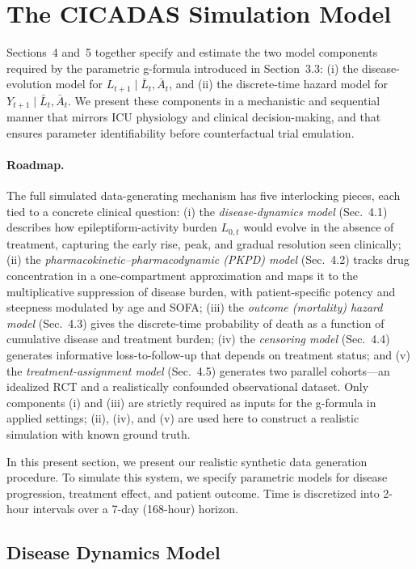 \section{The CICADAS Simulation Model}
\label{sec:datagen}
Sections~4 and~5 together specify and estimate the two model components required by the parametric g-formula introduced in Section~3.3: (i) the disease-evolution model for
$L_{t+1} \mid \bar{L}_t, \bar{A}_t$, and (ii) the discrete-time hazard model for
$Y_{t+1} \mid \bar{L}_t, \bar{A}_t$.
We present these components in a mechanistic and sequential manner that mirrors ICU physiology and clinical decision-making, and that ensures parameter identifiability before counterfactual trial emulation.

\paragraph{Roadmap.} The full simulated data-generating mechanism has five interlocking
pieces, each tied to a concrete clinical question:
(i) the \emph{disease-dynamics model} (Sec.~4.1) describes how
epileptiform-activity burden $L_{0,t}$ would evolve in the absence of treatment, capturing
the early rise, peak, and gradual resolution seen clinically;
(ii) the \emph{pharmacokinetic--pharmacodynamic (PKPD) model} (Sec.~4.2) tracks drug
concentration in a one-compartment approximation and maps it to the multiplicative
suppression of disease burden, with patient-specific potency and steepness modulated by age
and SOFA;
(iii) the \emph{outcome (mortality) hazard model} (Sec.~4.3) gives the discrete-time
probability of death as a function of cumulative disease and treatment burden;
(iv) the \emph{censoring model} (Sec.~4.4) generates informative loss-to-follow-up that
depends on treatment status; and
(v) the \emph{treatment-assignment model} (Sec.~4.5) generates two parallel cohorts---an
idealized RCT and a realistically confounded observational dataset.
Only components (i) and (iii) are strictly required as inputs for the g-formula in applied
settings; (ii), (iv), and (v) are used here to construct a realistic simulation with known
ground truth.

In this present section, we present our realistic synthetic data generation procedure. To simulate this system, we specify parametric models for disease progression, treatment effect, and patient outcome. Time is discretized into 2-hour intervals over a 7-day (168-hour) horizon.

\subsection{Disease Dynamics Model}
\label{sec:disease_dynamics}

